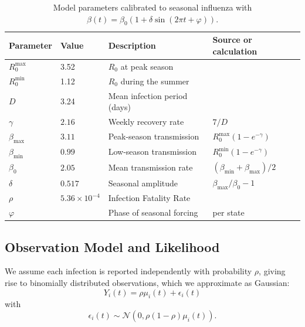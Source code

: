 \begin{table}[h]
\centering
\begin{tabular}{llll}
\toprule
Parameter & Value & Description & Source or calculation\\
\midrule
$R^{\text{max}}_0$ & 3.52 & $R_0$ at peak season & \citep{shaman2010} \\
$R^{\text{min}}_0$ & 1.12 & $R_0$ during the summer & \citep{shaman2010} \\
$D$ & 3.24 & Mean infection period (days) & \citep{shaman2010} \\
$\gamma$ & $2.16$ & Weekly recovery rate & $7 / D$ \\
$\beta_{\text{max}}$ & $3.11$ & Peak-season transmission & $R_0^{\text{max}}(1 - e^{-\gamma})$\\
$\beta_{\text{min}}$ & $0.99$ & Low-season transmission & $R_0^{\text{min}}(1 - e^{-\gamma})$ \\
$\beta_0$ & $2.05$ & Mean transmission rate & $(\beta_{\text{min}} + \beta_{\text{max}})/2$ \\
$\delta$ & $0.517$ & Seasonal amplitude & $\beta_{\text{max}} / \beta_0 - 1$\\
$\rho$ & $5.36 \times 10^{-4}$ & Infection Fatality Rate & \citep{rolfes2018}\\
$\varphi$ & & Phase of seasonal forcing & per state \\
\bottomrule
\end{tabular}
\caption{Model parameters calibrated to seasonal influenza with
  $\beta(t) = \beta_0(1+\delta \sin(2\pi t + \varphi))$.}
\label{tab:params}
\end{table}

\subsection{Observation Model and Likelihood}\label{subsec:noise}
We assume each infection is reported independently with probability
$\rho$, giving rise to binomially distributed observations, which we approximate as Gaussian:
%
%
$$
Y_i(t) = \rho\mu_i(t) + \epsilon_i(t)
$$
%
%
with
%
%
$$
\epsilon_i(t) \sim \mathcal{N}(0, \rho(1{-}\rho)\mu_i(t)).
$$
%
%

